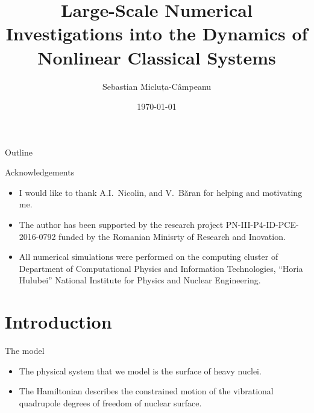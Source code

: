 \documentclass{beamer}
\title{Large-Scale Numerical Investigations into the Dynamics of Nonlinear Classical Systems}
\date{\today}
\author{Sebastian Micluța-Câmpeanu}
\institute{University of Bucharest}
\begin{document}
\maketitle


\begin{frame}{Outline}
  \tableofcontents[]
\end{frame}


\begin{frame}{Acknowledgements}
	\begin{itemize}
		\item I would like to thank A.I.~Nicolin, and V.~Băran for helping and motivating me.
		\item The author has been	supported by the research project PN-III-P4-ID-PCE-2016-0792
		funded by the Romanian Minisrty of Research and Inovation.
		\item All numerical simulations were performed on the computing cluster of
		Department of Computational Physics and Information Technologies,
		``Horia Hulubei'' National Institute for Physics and Nuclear Engineering.
	\end{itemize}
\end{frame}

\section{Introduction}


\begin{frame}{The model}
  \begin{itemize}
		\item The physical system that we model is the surface of heavy nuclei.
    \item The Hamiltonian describes the constrained motion of the vibrational quadrupole degrees of freedom of nuclear surface.
  \end{itemize}
\end{frame}

\end{document}
